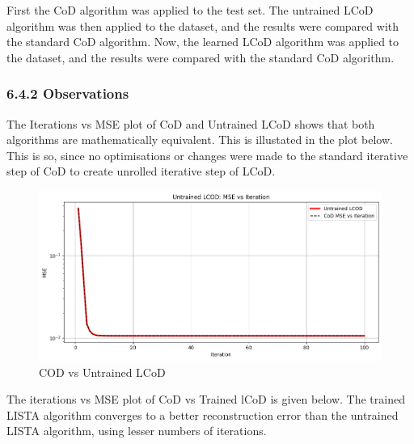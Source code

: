 \documentclass[
  letterpaper,
  DIV=11,
  numbers=noendperiod]{scrartcl}
\begin{document}
First the CoD algorithm was applied to the test set. The untrained LCoD
algorithm was then applied to the dataset, and the results were compared
with the standard CoD algorithm. Now, the learned LCoD algorithm was
applied to the dataset, and the results were compared with the standard
CoD algorithm.

\subsubsection{6.4.2 Observations}\label{observations}

The Iterations vs MSE plot of CoD and Untrained LCoD shows that both
algorithms are mathematically equivalent. This is illustated in the plot
below. This is so, since no optimisations or changes were made to the
standard iterative step of CoD to create unrolled iterative step of
LCoD.

\begin{figure}[H]

{\centering \includegraphics[width=1\linewidth,height=\textheight,keepaspectratio]{abar-cs_files/mediabag/CoDvsUntrainedCoD.png}

}

\caption{COD vs Untrained LCoD}

\end{figure}%

The iterations vs MSE plot of CoD vs Trained lCoD is given below. The
trained LISTA algorithm converges to a better reconstruction error than
the untrained LISTA algorithm, using lesser numbers of iterations.
\end{document}
